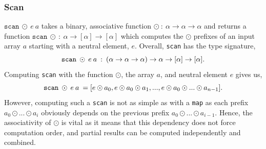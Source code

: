 \documentclass[11pt]{article}
\begin{document}

\subsubsection{Scan}
$\texttt{scan} \: \odot \: e \: a$ takes a binary, associative function $\odot \: : \: \alpha \to \alpha \to \alpha$ and returns a function
 $\mathtt{scan} \:\odot \: : \: \alpha \to [\alpha] \to [\alpha]$ which
 computes the $\odot$ prefixes of an input array $a$ starting with a neutral element, $e$. Overall, \texttt{scan} has the type signature,
$$\mathtt{scan} \: \odot \: e \: a \: : \:(\alpha \to \alpha \to \alpha) \to \alpha \to [\alpha] \to [\alpha]\mathnormal{.}$$
Computing \texttt{scan} with the function $\odot$, the array $a$, and neutral element $e$ gives us,
$$\mathtt{scan} \: \odot \: e \: a \: = [e \odot a_0, e \odot a_0 \odot a_1, ..., e \odot a_0 \odot ... \odot a_{n-1}]\mathnormal{.}$$
However, computing such a \texttt{scan} is not as simple as with a \texttt{map} as each prefix $a_0 \odot ... \odot a_i$ obviously depends on the previous prefix $a_0 \odot ... \odot a_{i-1}$. Hence, 
the associativity of $\odot$ is vital as it means that this dependency does not force computation order, and partial results can be computed independently and combined.

\end{document}

